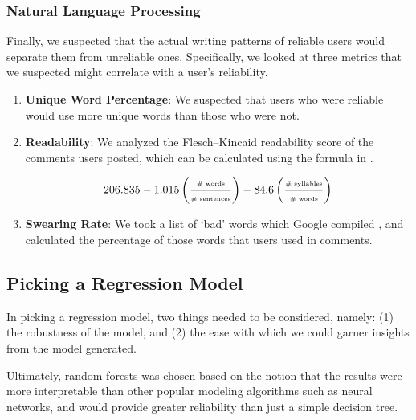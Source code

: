 

\subsubsection{Natural Language Processing} %
\label{ssub:natural_language_processing}

Finally, we suspected that the actual writing patterns of reliable users would
separate them from unreliable ones. Specifically, we looked at three metrics that we
suspected might correlate with a user's reliability.

\begin{enumerate}
    \item \textbf{Unique Word Percentage}: We suspected that users who were
      reliable would use more unique words than those who were not.

    \item \textbf{Readability}: We analyzed the Flesch--Kincaid readability
      \cite{kincaid1975derivation} score of the comments users posted, which can
      be calculated using the formula in .

    \begin{equation} \label{eq:fk_eq}
        206.835 - 1.015 \left(\frac{\text{\tiny \# words}}{\text{\tiny \# sentences}}\right) - 84.6 \left(\frac{\text{\tiny \# syllables}}{\text{\tiny \# words}}\right)
    \end{equation}

    \item \textbf{Swearing Rate}: We took a list of `bad' words which Google
      compiled \cite{googlebadwords}, and calculated the percentage of those
      words that users used in comments.

\end{enumerate}





\subsection{Picking a Regression Model} %
\label{sub:picking_a_regression_model}

In picking a regression model, two things needed to be considered, namely: (1)
the robustness of the model, and (2) the ease with which we could garner
insights from the model generated.

Ultimately, random forests \cite{598994} was chosen based on the notion that the
results were more interpretable than other popular modeling algorithms such as
neural networks, and would provide greater reliability than just a simple
decision tree.

